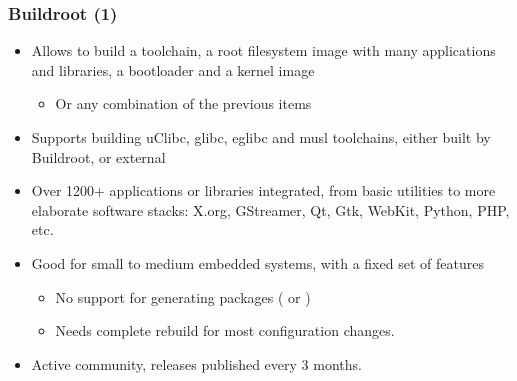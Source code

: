 \begin{frame}
  \frametitle{Buildroot (1)}
  \begin{itemize}
  \item Allows to build a toolchain, a root filesystem image with many
    applications and libraries, a bootloader and a kernel image
    \begin{itemize}
    \item Or any combination of the previous items
    \end{itemize}
  \item Supports building uClibc, glibc, eglibc and musl toolchains,
    either built by Buildroot, or external
  \item Over 1200+ applications or libraries integrated, from basic
    utilities to more elaborate software stacks: X.org, GStreamer, Qt,
    Gtk, WebKit, Python, PHP, etc.
  \item Good for small to medium embedded systems, with a fixed set of
    features
    \begin{itemize}
    \item No support for generating packages ( or
      )
    \item Needs complete rebuild for most configuration changes.
    \end{itemize}
  \item Active community, releases published every 3 months.
  \end{itemize}
\end{frame}

